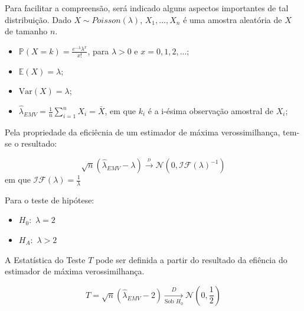 \documentclass[11pt,]{article}
\providecommand{\tightlist}{%
  \setlength{\itemsep}{0pt}\setlength{\parskip}{0pt}}
\begin{document}
Para facilitar a compreensão, será indicado alguns aspectos importantes
de tal distribuição. Dado \(X \sim Poisson(\lambda)\), \(X_1, ..., X_n\)
é uma amostra aleatória de \(X\) de tamanho \(n\).

\begin{itemize}
\item
  \(\mathbb{P}(X=k)=\frac{e^{-\lambda}\lambda^x}{x!}\), para
  \(\lambda > 0\) e \(x = 0, 1, 2, ...\);
\item
  \(\mathbb{E}(X) = \lambda\);
\item
  \(\text{Var}(X) = \lambda\);
\item
  \(\hat{\lambda}_{EMV} = \frac{1}{n}\sum_{i=1}^n X_i = \bar{X}\), em
  que \(k_i\) é a i-ésima observação amostral de \(X_i\);
\end{itemize}

Pela propriedade da eficiêcnia de um estimador de máxima
verossimilhança, tem-se o resultado:

\[\sqrt{n}(\hat{\lambda}_{EMV}-\lambda)\xrightarrow{_D}\mathcal{N}(0,\mathcal{IF}(\lambda)^{-1})\]
em que \(\mathcal{IF}(\lambda) = \frac{1}{\lambda}\)

Para o teste de hipótese:

\begin{itemize}
\tightlist
\item
  \(H_0:\) \(\lambda = 2\)
\item
  \(H_A:\) \(\lambda > 2\)
\end{itemize}

A Estatística do Teste \(T\) pode ser definida a partir do resultado da
efiência do estimador de máxima verossimilhança.

\[T = \sqrt{n}(\hat{\lambda}_{EMV}-2)\xrightarrow[\text{Sob } H_0]{D}\mathcal{N}\left(0,\frac{1}{2} \right)\]
\end{document}
